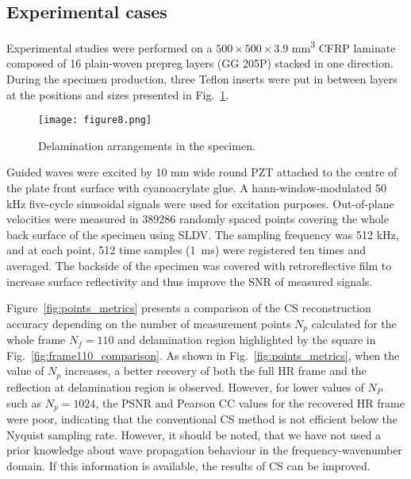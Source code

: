 \subsection{Experimental cases}

Experimental studies were performed on a $500 \times 500\times 3.9$ mm\textsuperscript{3} CFRP laminate composed of 16 plain-woven prepreg layers (GG 205P) stacked in one direction. 
During the specimen production, three Teflon inserts were put in between layers at the positions and sizes presented in Fig.~\ref{fig:specimen}.

\begin{figure} [!ht]
	\centering
	\texttt{[image: figure8.png]}
	\caption{Delamination arrangements in the specimen.}
	\label{fig:specimen}
\end{figure}

Guided waves were excited by 10 mm wide round PZT attached to the centre of the plate front surface with cyanoacrylate glue. 
A hann-window-modulated 50 kHz five-cycle sinusoidal signals were used for excitation purposes.
Out-of-plane velocities were measured in 389286 randomly spaced points covering the whole back surface of the specimen using SLDV. 
The sampling frequency was 512 kHz, and at each point, 512 time samples (1 ms) were registered ten times and averaged.
The backside of the specimen was covered with retroreflective film to increase surface reflectivity and thus improve the SNR of measured signals.

Figure~\ref{fig:points_metrics} presents a comparison of the CS reconstruction accuracy depending on the number of measurement points $N_p$ calculated for the whole frame $N_f=110$ and delamination region highlighted by the square in Fig.~\ref{fig:frame110_comparison}.
As shown in Fig.~\ref{fig:points_metrics}, when the value of $N_p$ increases, a better recovery of both the full HR frame and the reflection at delamination region is observed.
However, for lower values of $N_P$ such as $N_p=1024$, the PSNR and Pearson CC values for the recovered HR frame were poor, indicating that the conventional CS method is not efficient below the Nyquist sampling rate.
However, it should be noted, that we have not used a prior knowledge about wave propagation behaviour in the frequency-wavenumber domain. 
If this information is available, the results of CS can be improved. 

